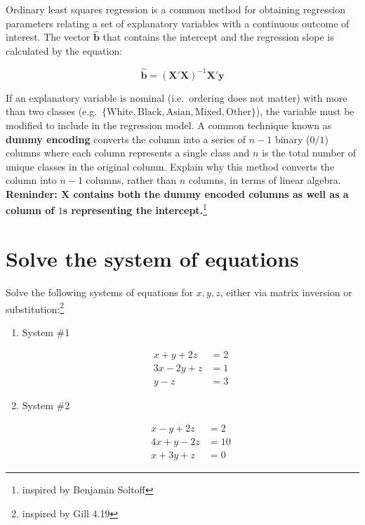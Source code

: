 \documentclass[
]{article}
\begin{document}
Ordinary least squares regression is a common method for obtaining
regression parameters relating a set of explanatory variables with a
continuous outcome of interest. The vector \(\hat{\mathbf{b}}\) that
contains the intercept and the regression slope is calculated by the
equation:

\[\hat{\mathbf{b}} = (\mathbf{X'X})^{-1}\mathbf{X'y}\]

If an explanatory variable is nominal (i.e.~ordering does not matter)
with more than two classes
(e.g.~\(\{\text{White}, \text{Black}, \text{Asian}, \text{Mixed}, \text{Other}\}\)),
the variable must be modified to include in the regression model. A
common technique known as \textbf{dummy encoding} converts the column
into a series of \(n-1\) binary (\(0/1\)) columns where each column
represents a single class and \(n\) is the total number of unique
classes in the original column. Explain why this method converts the
column into \(n-1\) columns, rather than \(n\) columns, in terms of
linear algebra. \textbf{Reminder: \(\mathbf{X}\) contains both the dummy
encoded columns as well as a column of \(1\)s representing the
intercept.}\footnote{inspired by Benjamin Soltoff}

\section{Solve the system of
equations}\label{solve-the-system-of-equations}

Solve the following systems of equations for \(x, y, z\), either via
matrix inversion or substitution:\footnote{inspired by Gill 4.19}

\begin{enumerate}
\def\labelenumi{\alph{enumi}.}
\item
  System \#1

  \[
   \begin{aligned}
       x +   y + 2z &=  2 \\
       3x -  2y +  z &= 1 \\
       y -  z &= 3
   \end{aligned}
   \]
\item
  System \#2

  \[
   \begin{aligned}
   x - y + 2z &= 2 \\
   4x + y -2z &= 10 \\
   x + 3y +z &= 0
   \end{aligned}
   \]
\end{enumerate}
\end{document}
